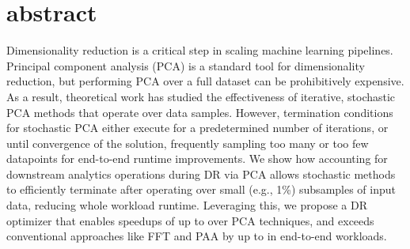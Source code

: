 \section*{abstract}
Dimensionality reduction is a critical step in scaling machine learning pipelines. Principal component analysis (PCA) is a standard tool for dimensionality reduction, but performing PCA over a full dataset can be prohibitively expensive. 
As a result, theoretical work has studied the effectiveness of iterative, stochastic PCA methods that operate over data samples. 
However, termination conditions for stochastic PCA either execute for a predetermined number of iterations, or until convergence of the solution, frequently sampling too many or too few datapoints for end-to-end runtime improvements. We show how accounting for downstream analytics operations during DR via PCA allows stochastic methods to efficiently terminate after operating over small (e.g., 1\%) subsamples of input data, reducing whole workload runtime. 
Leveraging this, we propose a DR optimizer that enables speedups of up to \red{$5\times$} over  PCA techniques, and exceeds conventional approaches like FFT and PAA by up to \red{$16\times$} in end-to-end workloads.










